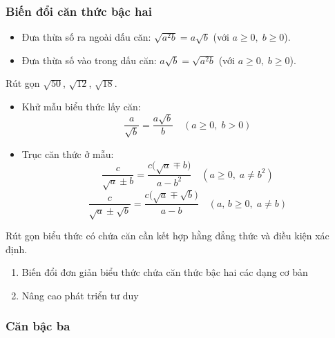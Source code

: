 \documentclass[12pt,a4paper]{article}
\begin{document}
\subsubsection{Biến đổi căn thức bậc hai}

\begin{congthuc}
  \begin{itemize}
    \item Đưa thừa số ra ngoài dấu căn: $\sqrt{a^2 b} = a\sqrt{b}$ \quad (với $a \ge 0,\; b \ge 0$).
    \item Đưa thừa số vào trong dấu căn: $a\sqrt{b} = \sqrt{a^2 b}$ \quad (với $a \ge 0,\; b \ge 0$).
  \end{itemize}
\end{congthuc}

\begin{vidu}
  Rút gọn $\sqrt{50}$, $\sqrt{12}$, $\sqrt{18}$.
\end{vidu}

\begin{phuongphap}[title={Khử mẫu và trục căn thức ở mẫu}]
  \begin{itemize}
    \item Khử mẫu biểu thức lấy căn:
    \[\frac{a}{\sqrt{b}} = \frac{a\sqrt{b}}{b} \quad (a \ge 0,\; b > 0)\]
    \item Trục căn thức ở mẫu:
    \[\frac{c}{\sqrt{a} \pm b} = \frac{c\bigl(\sqrt{a} \mp b\bigr)}{a - b^2} \quad (a \ge 0,\; a \neq b^2)\]
    \[\frac{c}{\sqrt{a} \pm \sqrt{b}} = \frac{c\bigl(\sqrt{a} \mp \sqrt{b}\bigr)}{a - b} \quad (a,\, b \ge 0,\; a \neq b)\]
  \end{itemize}
\end{phuongphap}

\begin{luuy}
  Rút gọn biểu thức có chứa căn cần kết hợp hằng đẳng thức và điều kiện xác định.
\end{luuy}

\begin{enumerate}[label=\textbf{Dạng \arabic*:}, leftmargin=*, align=left]
  \item Biến đổi đơn giản biểu thức chứa căn thức bậc hai các dạng cơ bản
  \item Nâng cao phát triển tư duy
\end{enumerate}

\subsubsection{Căn bậc ba}
\end{document}
